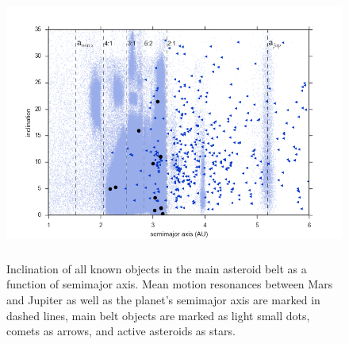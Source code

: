 \documentclass[iop,apj]{emulateapj}
\begin{document}
\begin{figure}[!htb]
    \centering
    \includegraphics[height=9cm]{graphs/aa_comets_mba_all.png}
    \caption{Inclination of all known objects in the main asteroid belt as a function of semimajor axis.  Mean motion resonances between Mars and Jupiter as well as the planet's semimajor axis are marked in dashed lines, main belt objects are marked as light small dots, comets as arrows, and active asteroids as stars. \cite{mpc}}\label{fig:1}
\end{figure}

%
\end{document}
